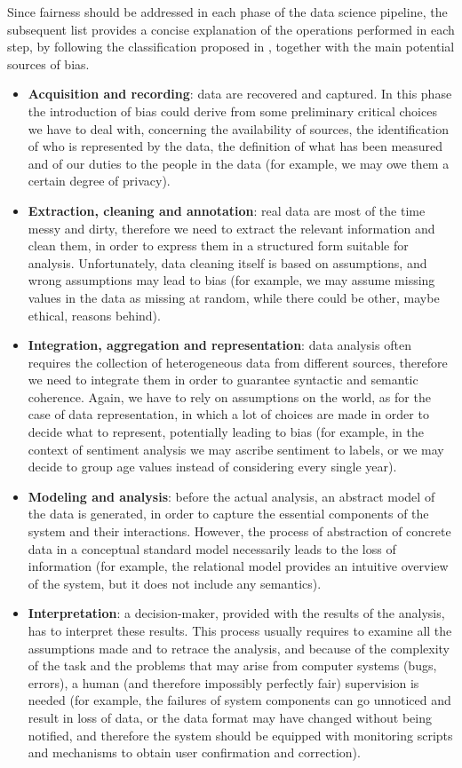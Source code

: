 Since fairness should be addressed in each phase of the data science pipeline, the subsequent list provides a concise explanation of the operations performed in each step, by following the classification proposed in \cite{jagadish2014big}, together with the main potential sources of bias.
\begin{itemize}
\item \textbf{Acquisition and recording}: data are recovered and captured. In this phase the introduction of bias could derive from some preliminary critical choices we have to deal with, concerning the availability of sources, the identification of who is represented by the data, the definition of what has been measured and of our duties to the people in the data (for example, we may owe them a certain degree of privacy).
\item \textbf{Extraction, cleaning and annotation}: real data are most of the time messy and dirty, therefore we need to extract the relevant information and clean them, in order to express them in a structured form suitable for analysis. Unfortunately, data cleaning itself is based on assumptions, and wrong assumptions may lead to bias (for example, we may assume missing values in the data as missing at random, while there could be other, maybe ethical, reasons behind).
\item \textbf{Integration, aggregation and representation}: data analysis often requires the collection of heterogeneous data from different sources, therefore we need to integrate them in order to guarantee syntactic and semantic coherence. Again, we have to rely on assumptions on the world, as for the case of data representation, in which a lot of choices are made in order to decide what to represent, potentially leading to bias (for example, in the context of sentiment analysis we may ascribe sentiment to labels, or we may decide to group age values instead of considering every single year).
\item \textbf{Modeling and analysis}: before the actual analysis, an abstract model of the data is generated, in order to capture the essential components of the system and their interactions. However, the process of abstraction of concrete data in a conceptual standard model necessarily leads to the loss of information (for example, the relational model provides an intuitive overview of the system, but it does not include any semantics).
\item \textbf{Interpretation}: a decision-maker, provided with the results of the analysis, has to interpret these results. This process usually requires to examine all the assumptions made and to retrace the analysis, and because of the complexity of the task and the problems that may arise from computer systems (bugs, errors), a human (and therefore impossibly perfectly fair) supervision is needed (for example, the failures of system components can go unnoticed and result in loss of data, or the data format may have changed without being notified, and therefore the system should be equipped with monitoring scripts and mechanisms to obtain user confirmation and correction).
\end{itemize}


